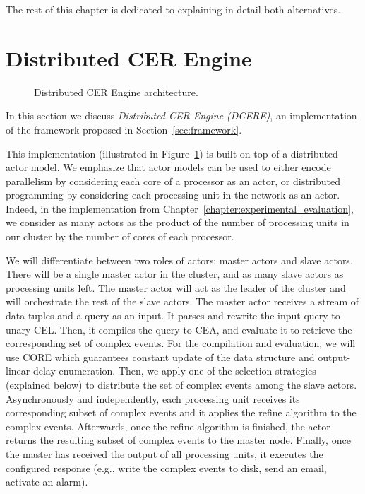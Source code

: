 The rest of this chapter is dedicated to explaining in detail both alternatives.

\section{Distributed CER Engine}\label{sec:dcere}

\begin{figure}[t]
  \centering
  \caption{Distributed CER Engine architecture.}
  \label{fig:dcere}
\end{figure}

In this section we discuss \emph{Distributed CER Engine (DCERE)}, an implementation of the framework proposed in Section~\ref{sec:framework}.

This implementation (illustrated in Figure~\ref{fig:dcere}) is built on top of a distributed actor model. We emphasize that actor models can be used to either encode parallelism by considering each core of a processor as an actor, or distributed programming by considering each processing unit in the network as an actor. Indeed, in the implementation from Chapter~\ref{chapter:experimental_evaluation}, we consider as many actors as the product of the number of processing units in our cluster by the number of cores of each processor.

We will differentiate between two roles of actors: master actors and slave actors. There will be a single master actor in the cluster, and as many slave actors as processing units left. The master actor will act as the leader of the cluster and will orchestrate the rest of the slave actors. The master actor receives a stream of data-tuples and a query as an input. It parses and rewrite the input query to unary CEL. Then, it compiles the query to CEA, and evaluate it to retrieve the corresponding set of complex events. For the compilation and evaluation, we will use CORE \cite{core} which guarantees constant update of the data structure and output-linear delay enumeration. Then, we apply one of the selection strategies (explained below) to distribute the set of complex events among the slave actors. Asynchronously and independently, each processing unit receives its corresponding subset of complex events and it applies the refine algorithm to the complex events. Afterwards, once the refine algorithm is finished, the actor returns the resulting subset of complex events to the master node. Finally, once the master has received the output of all processing units, it executes the configured response (e.g., write the complex events to disk, send an email, activate an alarm).

